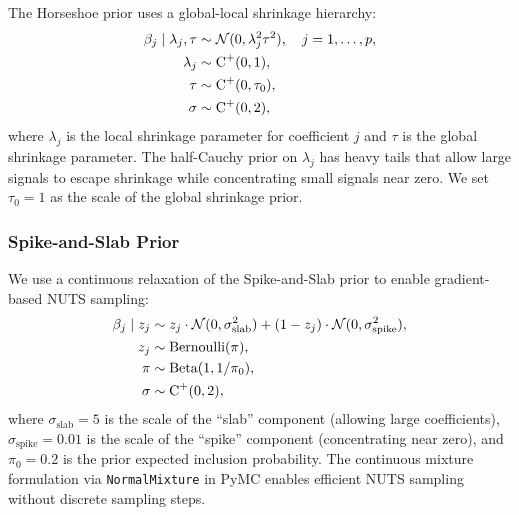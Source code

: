 The Horseshoe prior \citep{carvalho2010horseshoe} uses a global-local shrinkage hierarchy:
\begin{align}
\beta_j \mid \lambda_j, \tau &\sim \mathcal{N}(0, \lambda_j^2 \tau^2), \quad j = 1, \ldots, p, \\
\lambda_j &\sim \text{C}^{+}(0, 1), \label{eq:hs_local} \\
\tau &\sim \text{C}^{+}(0, \tau_0), \label{eq:hs_global} \\
\sigma &\sim \text{C}^{+}(0, 2),
\end{align}
where $\lambda_j$ is the local shrinkage parameter for coefficient $j$ and $\tau$ is the global shrinkage parameter.
The half-Cauchy prior on $\lambda_j$ has heavy tails that allow large signals to escape shrinkage while concentrating small signals near zero.
We set $\tau_0 = 1$ as the scale of the global shrinkage prior.

\subsubsection{Spike-and-Slab Prior}

We use a continuous relaxation of the Spike-and-Slab prior \citep{mitchell1988bayesian} to enable gradient-based NUTS sampling:
\begin{align}
\beta_j \mid z_j &\sim z_j \cdot \mathcal{N}(0, \sigma_{\text{slab}}^2) + (1 - z_j) \cdot \mathcal{N}(0, \sigma_{\text{spike}}^2), \\
z_j &\sim \text{Bernoulli}(\pi), \\
\pi &\sim \text{Beta}(1, 1/\pi_0), \\
\sigma &\sim \text{C}^{+}(0, 2),
\end{align}
where $\sigma_{\text{slab}} = 5$ is the scale of the ``slab'' component (allowing large coefficients), $\sigma_{\text{spike}} = 0.01$ is the scale of the ``spike'' component (concentrating near zero), and $\pi_0 = 0.2$ is the prior expected inclusion probability.
The continuous mixture formulation via \texttt{NormalMixture} in PyMC enables efficient NUTS sampling without discrete sampling steps.
